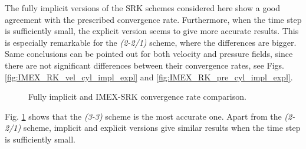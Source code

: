 The fully implicit versions of the SRK schemes considered here show a good agreement with the prescribed convergence rate. Furthermore, when the time step is sufficiently small, the explicit version seems to give more accurate results. This is especially remarkable for the \textit{(2-2/1)} scheme, where the differences are bigger. Same conclusions can be pointed out for both velocity and pressure fields, since there are not significant differences between their convergence rates, see Figs. \ref{fig:IMEX_RK_vel_cyl_impl_expl} and  \ref{fig:IMEX_RK_pre_cyl_impl_expl}. 
\begin{figure}[h!]
  \centering
  \caption{Fully implicit and IMEX-SRK convergence rate comparison.}
  \label{fig:IMEX_RK_cyl_conv_impl_expl}
\end{figure}
Fig. \ref{fig:IMEX_RK_cyl_conv_impl_expl} shows that the \textit{(3-3)} scheme is the most accurate one. Apart from the \textit{(2-2/1)} scheme, implicit and explicit versions give similar results when the time step is sufficiently small. 

